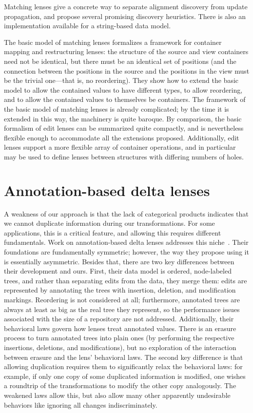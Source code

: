 Matching lenses give a concrete way to separate alignment discovery from
update propagation, and propose several promising discovery heuristics.
There is also an implementation available for a string-based data model.

The basic model of matching lenses formalizes a framework for container mapping and
restructuring lenses: the structure of the source and view containers need
not be identical, but there must be an identical set of positions (and the
connection between the positions in the source and the positions in the view
must be the trivial one---that is, no reordering). They show how to extend
the basic model to allow the contained values to have different types, to
allow reordering, and to allow the contained values to themselves be
containers. The framework of the basic model of matching lenses is already
complicated; by the time it is extended in this way, the machinery is quite
baroque. By comparison, the basic formalism of edit lenses can be summarized
quite compactly, and is nevertheless flexible enough to accommodate all the
extensions proposed. Additionally, edit lenses support a more flexible array
of container operations, and in particular may be used to define lenses
between structures with differing numbers of holes.

\section{Annotation-based delta lenses}
\label{sec:annotations}
A weakness of our approach is that the lack of categorical products
indicates that we cannot duplicate information during our transformations.
For some applications, this is a critical feature, and allowing this requires
different fundamentals. Work on annotation-based delta lenses addresses this
niche~\cite{Hu04,HuEditor08,MuAlgebraic2004}. Their foundations are
fundamentally symmetric; however, the way they propose using it is
essentially asymmetric. Besides that, there are two key differences between
their development and ours. First, their data model is ordered, node-labeled
trees, and rather than separating edits from the data, they merge them:
edits are represented by annotating the trees with insertion, deletion, and
modification markings. Reordering is not considered at all; furthermore,
annotated trees are always at least as big as the real tree they represent,
so the performance issues associated with the size of a repository are not
addressed. Additionally, their behavioral laws govern
how lenses treat annotated values. There is an erasure process to turn
annotated trees into plain ones (by performing the respective insertions,
deletions, and modifications), but no exploration of the interaction between
erasure and the lens' behavioral laws. The second key difference is that
allowing duplication requires them to significantly relax the behavioral
laws: for example, if only one copy of some duplicated information is
modified, one wishes a roundtrip of the transformations to modify the other
copy analogously. The weakened laws allow this, but also allow many other
apparently undesirable behaviors like ignoring all changes indiscriminately.

